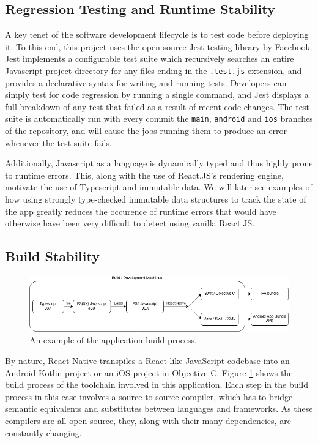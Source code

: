 \subsection{Regression Testing and Runtime Stability}
A key tenet of the software development lifecycle is to test code before deploying it. To this end, this project uses the open-source Jest testing library by Facebook. Jest implements a configurable test suite which recursively searches an entire Javascript project directory for any files ending in the \texttt{.test.js} extension, and provides a declarative syntax for writing and running tests. Developers can simply test for code regression by running a single command, and Jest displays a full breakdown of any test that failed as a result of recent code changes. The test suite is automatically run with every commit the \texttt{main}, \texttt{android} and \texttt{ios} branches of the repository, and will cause the jobs running them to produce an error whenever the test suite fails.

Additionally, Javascript as a language is dynamically typed and thus highly prone to runtime errors. This, along with the use of React.JS's rendering engine, motivate the use of Typescript and immutable data. We will later see examples of how using strongly type-checked immutable data structures to track the state of the app greatly reduces the occurence of runtime errors that would have otherwise have been very difficult to detect using vanilla React.JS.


\subsection{Build Stability}
\begin{figure}[h]
    \begin{center}
        \includegraphics[scale=0.55]{images/app_build_path.png}
    \end{center}
    \caption{An example of the application build process.}
    \label{fig:app_build_process}
\end{figure}

By nature, React Native transpiles a React-like JavaScript codebase into an Android Kotlin project or an iOS project in Objective C. Figure \ref{fig:app_build_process} shows the build process of the toolchain involved in this application. Each step in the build process in this case involves a source-to-source compiler, which has to bridge semantic equivalents and substitutes between languages and frameworks. As these compilers are all open source, they, along with their many dependencies, are constantly changing.

